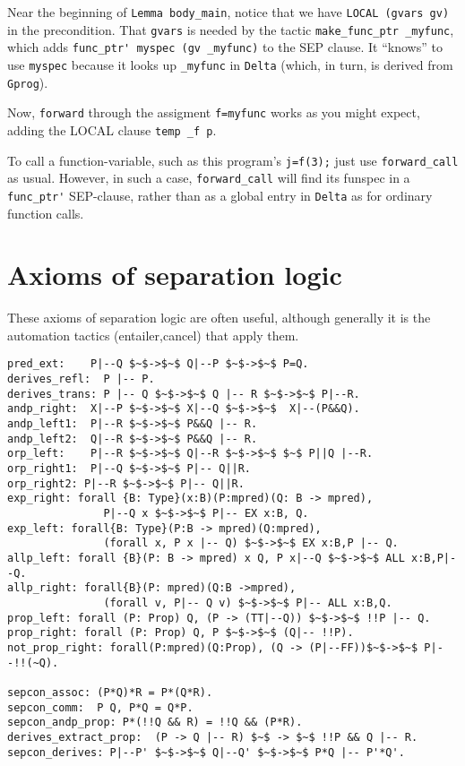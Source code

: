 \documentclass[12pt,fleqn,openany,oneside,showtrims]{memoir}
\newcommand{\ychapter}[2]{\chapter[#1]{#1}}
\begin{document}
Near the beginning of \lstinline{Lemma body_main},
notice that we have \linebreak
\lstinline{LOCAL (gvars gv)} in the precondition.
That \lstinline{gvars} is needed by
the tactic \lstinline{make_func_ptr _myfunc},
which adds \lstinline{func_ptr' myspec (gv _myfunc)} to the SEP clause.
It ``knows'' to use \lstinline{myspec} because it looks
up \lstinline{_myfunc} in
\lstinline{Delta} (which, in turn, is derived from \lstinline{Gprog}).

Now, \lstinline{forward} through the assigment \lstinline{f=myfunc}
works as you might expect, adding the LOCAL clause
\lstinline{temp _f p}.

To call a function-variable, such as this program's \lstinline{j=f(3);}
just use \lstinline{forward_call} as usual.  However, in such a case,
\lstinline{forward_call} will find its funspec in a
\lstinline{func_ptr'} SEP-clause, rather than as a global entry
in \lstinline{Delta} as for ordinary function calls.

\ychapter{Axioms of separation logic}{(see PLCC \autoref{ch:logic})}
These axioms of separation logic are often useful,
although generally it is the automation tactics
(\textsf{entailer,cancel}) that apply them.

\begin{lstlisting}
pred_ext:    P|--Q $~$->$~$ Q|--P $~$->$~$ P=Q.
derives_refl:  P |-- P.
derives_trans: P |-- Q $~$->$~$ Q |-- R $~$->$~$ P|--R.
andp_right:  X|--P $~$->$~$ X|--Q $~$->$~$  X|--(P&&Q).
andp_left1:  P|--R $~$->$~$ P&&Q |-- R.
andp_left2:  Q|--R $~$->$~$ P&&Q |-- R.
orp_left:    P|--R $~$->$~$ Q|--R $~$->$~$ $~$ P||Q |--R.
orp_right1:  P|--Q $~$->$~$ P|-- Q||R.
orp_right2: P|--R $~$->$~$ P|-- Q||R.
exp_right: forall {B: Type}(x:B)(P:mpred)(Q: B -> mpred),
               P|--Q x $~$->$~$ P|-- EX x:B, Q.
exp_left: forall{B: Type}(P:B -> mpred)(Q:mpred),
               (forall x, P x |-- Q) $~$->$~$ EX x:B,P |-- Q.
allp_left: forall {B}(P: B -> mpred) x Q, P x|--Q $~$->$~$ ALL x:B,P|--Q.
allp_right: forall{B}(P: mpred)(Q:B ->mpred),
               (forall v, P|-- Q v) $~$->$~$ P|-- ALL x:B,Q.
prop_left: forall (P: Prop) Q, (P -> (TT|--Q)) $~$->$~$ !!P |-- Q.
prop_right: forall (P: Prop) Q, P $~$->$~$ (Q|-- !!P).
not_prop_right: forall(P:mpred)(Q:Prop), (Q -> (P|--FF))$~$->$~$ P|--!!(~Q).

sepcon_assoc: (P*Q)*R = P*(Q*R).
sepcon_comm:  P Q, P*Q = Q*P.
sepcon_andp_prop: P*(!!Q && R) = !!Q && (P*R).
derives_extract_prop:  (P -> Q |-- R) $~$ -> $~$ !!P && Q |-- R.
sepcon_derives: P|--P' $~$->$~$ Q|--Q' $~$->$~$ P*Q |-- P'*Q'.
\end{lstlisting}
\end{document}
